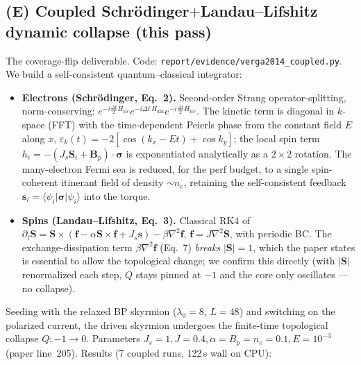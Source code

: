 \documentclass[11pt]{article}
\begin{document}
\subsection{(E) Coupled Schr\"odinger$+$Landau--Lifshitz dynamic collapse (this pass)}
The coverage-flip deliverable. Code: \texttt{report/evidence/verga2014\_coupled.py}.
We build a self-consistent quantum--classical integrator:
\begin{itemize}
\item \textbf{Electrons (Schr\"odinger, Eq.~2).} Second-order Strang
operator-splitting, norm-conserving:
$e^{-i\frac{\Delta t}{2}H_{\text{loc}}}e^{-i\Delta t\,H_{\text{kin}}}
 e^{-i\frac{\Delta t}{2}H_{\text{loc}}}$.
The kinetic term is diagonal in $k$-space (FFT) with the time-dependent Peierls
phase from the constant field $E$ along $x$,
$\varepsilon_k(t)=-2[\cos(k_x-Et)+\cos k_y]$; the local spin term
$h_i=-(J_s\mathbf S_i+\mathbf B_p)\!\cdot\!\boldsymbol\sigma$ is exponentiated
analytically as a $2\times2$ rotation. The many-electron Fermi sea is reduced,
for the perf budget, to a single spin-coherent itinerant field of density
$\sim n_e$, retaining the self-consistent feedback $\mathbf s_i=\langle\psi_i|
\boldsymbol\sigma|\psi_i\rangle$ into the torque.
\item \textbf{Spins (Landau--Lifshitz, Eq.~3).} Classical RK4 of
$\partial_t\mathbf S=\mathbf S\times(\mathbf f-\alpha\mathbf S\times\mathbf f
+J_s\mathbf s)-\beta\nabla^2\mathbf f$, $\mathbf f=J\nabla^2\mathbf S$, with
periodic BC. The exchange-dissipation term $\beta\nabla^2\mathbf f$ (Eq.~7)
\emph{breaks} $|\mathbf S|=1$, which the paper states is essential to allow the
topological change; we confirm this directly (with $|\mathbf S|$ renormalized
each step, $Q$ stays pinned at $-1$ and the core only oscillates --- no collapse).
\end{itemize}
Seeding with the relaxed BP skyrmion ($\lambda_0=8$, $L=48$) and switching on the
polarized current, the driven skyrmion undergoes the finite-time topological
collapse $Q:-1\!\to\!0$. Parameters $J_s=1,J=0.4,\alpha=B_p=n_e=0.1,E=10^{-3}$
(paper line~205). Results (7 coupled runs, 122\,s wall on CPU):
\end{document}

